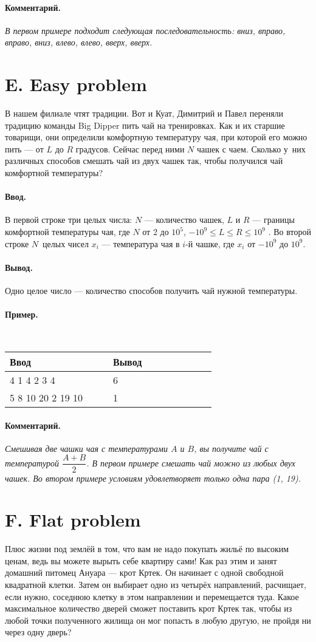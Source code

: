 \documentclass[10pt, a5paper]{article}
\newcommand{\informat}[1]
{
	\paragraph{Ввод.\\} #1
}
\newcommand{\outformat}[1]
{
	\paragraph{Вывод.\\} #1
}
\newcommand{\examplee}[4]
{
	\paragraph{Пример.\\}
	{\tt
	\begin{tabular}{|p{0.4\linewidth}|p{0.4\linewidth}|}
	\hline
	Ввод 	& Вывод  	\\
	\hline
	#1 		& #2 		\\
	\hline
	#3		& #4		\\
	\hline
	\end{tabular}
	}
}
\newcommand{\excomm}[1]
{
	\paragraph{Комментарий. \\}
	\textit{#1}
}
\begin{document}
\excomm{В первом примере подходит следующая последовательность: вниз, впра\-во, впра\-во, вниз, влево, влево, вверх, вверх.}





\section*{E. Easy problem}


В нашем филиале чтят традиции. Вот и Куат, Димитрий и Павел переняли традицию команды Big Dipper пить чай на тренировках. Как и их старшие товарищи, они определили комфортную температуру чая, при которой его мож\-но пить --- от $L$ до $R$ градусов. Сейчас перед ними $N$ чашек с чаем. Сколько у~них различных способов смешать чай из двух чашек так, чтобы получился чай комфортной температуры?

\informat{В первой строке три целых числа: $N$ --- количество чашек, $L$ и $R$ --- границы комфортной температуры чая, где $N$ от 2 до $10^5$, $-10^9 \leqslant L \leqslant R \leqslant 10^9$ . \newline
Во второй строке $N$~целых чисел $x_i$ --- температура чая в $i$-й чашке, где $x_i$ от $-10^9$ до $10^9$.}

\outformat{Одно целое число --- количество способов получить чай нужной температуры.}
 
\examplee{
4 1 4 \newline 
1 2 3 4}
{6}
{
5 8 10 \newline
1 20 2 19 10}
{1}

\excomm{Смешивая две чашки чая с температурами $A$ и $B$, вы получите чай с тем\-пе\-ра\-ту\-рой $\dfrac{A+B}{2}$. В первом примере смешать чай можно из любых двух чашек. Во втором примере условиям удовлетворяет только одна пара (1, 19).}
 


\section*{F. Flat problem}

 
Плюс жизни под землёй в том, что вам не надо покупать жильё по высоким ценам, ведь вы можете вырыть себе квартиру сами! Как раз этим и занят домашний питомец Ануара --- крот Кртек. Он начинает с одной свободной квадратной клетки. Затем он выбирает одно из четырёх направлений, рас\-чи\-ща\-ет, если нужно, соседнюю клетку в этом направлении и перемещается туда. Какое максимальное количество дверей сможет поставить крот Кртек так, чтобы из любой точки полученного жилища он мог попасть в любую другую, не пройдя ни через одну дверь? 
 
\end{document}
